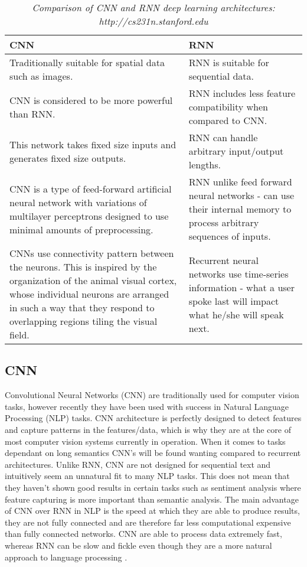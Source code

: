 \documentclass[twocolumn,12pt]{asme2ej}
\begin{document}
\begin{table*}[t]
 \begin{tabular}{||p{8.5cm}||p{8.5cm}||} 
     \hline
     \textbf{CNN} & \textbf{RNN} \\ [0.5ex] 
     \hline\hline
     Traditionally suitable for spatial data such as images. & RNN is suitable for sequential data.  \\ 
     \hline
     CNN is considered to be more powerful than RNN. & RNN includes less feature compatibility when compared to CNN.  \\
     \hline
     This network takes fixed size inputs and generates fixed size outputs. & RNN can handle arbitrary input/output lengths. \\
     \hline
     CNN is a type of feed-forward artificial neural network with variations of multilayer perceptrons designed to use minimal amounts of preprocessing. & RNN unlike feed forward neural networks - can use their internal memory to process arbitrary sequences of inputs.  \\
     \hline
     CNNs use connectivity pattern between the neurons. This is inspired by the organization of the animal visual cortex, whose individual neurons are arranged in such a way that they respond to overlapping regions tiling the visual field. & Recurrent neural networks use time-series information - what a user spoke last will impact what he/she will speak next.  \\ [1ex] 
     \hline

\end{tabular}
    \caption{\textit{Comparison of CNN and RNN deep learning architectures: http://cs231n.stanford.edu}}
    \label{tab:1}
\end{table*}



\subsection{CNN}

Convolutional Neural Networks (CNN) are traditionally used for computer vision tasks, however recently they have been used with success in Natural Language Processing (NLP) tasks. CNN architecture is perfectly designed to detect features and capture patterns in the features/data, which is why they are at the core of most computer vision systems currently in operation. When it comes to tasks dependant on long semantics CNN’s will be found wanting compared to recurrent architectures. Unlike RNN, CNN are not designed for sequential text and intuitively seem an unnatural fit to many NLP tasks. This does not mean that they haven’t shown good results in certain tasks such as sentiment analysis where feature capturing is more important than semantic analysis. The main advantage of CNN over RNN in NLP is the speed at which they are able to produce results, they are not fully connected and are therefore far less computational expensive than fully connected networks. CNN are able to process data extremely fast, whereas RNN can be slow and fickle even though they are a more natural approach to language processing \cite{PrimerNeuralNetworkModelsforNaturalLanguageProcessin}. 
\end{document}
